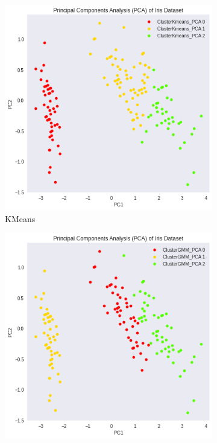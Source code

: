 \documentclass{homework}
\begin{document}
\begin{figure}[hbt!]
     \centering
     \begin{subfigure}[b]{0.3\textwidth}
         \centering
         \includegraphics[width=\textwidth]{KMeans_PCA.png}
         \caption{KMeans}
     \end{subfigure}
     \hfill
     \begin{subfigure}[b]{0.3\textwidth}
         \centering
         \includegraphics[width=\textwidth]{EM_PCA.png}

\end{subfigure}
\end{figure}
\end{document}
